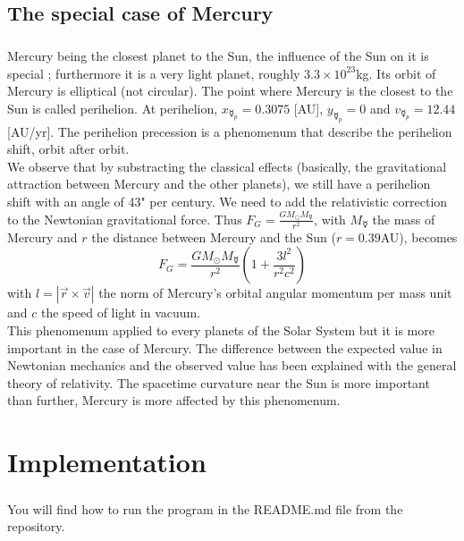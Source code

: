 \documentclass[a4paper, twoside, 11pt]{report}
\theoremstyle{theorem}
\theoremstyle{remark}
\theoremstyle{exemple}
\begin{document}
        \section{The special case of Mercury}
        
                \paragraph{}Mercury being the closest planet to the Sun, the influence of the Sun on it is special ; furthermore it is a very light planet, roughly $3.3\times{10}^{23}$kg. Its orbit of Mercury is elliptical (not circular). The point where Mercury is the closest to the Sun is called perihelion. At perihelion, $x_{\mercury_p} = 0.3075$ [AU], $y_{\mercury_p} = 0$ and $v_{\mercury_p}=12.44$ [AU/yr]. The perihelion precession is a phenomenum that describe the perihelion shift, orbit after orbit. \\
                We observe that by substracting the classical effects (basically, the gravitational attraction between Mercury and the other planets), we still have a perihelion shift with an angle of 43" per century. We need to add the relativistic correction to the Newtonian gravitational force. Thus $\displaystyle F_G = \frac{GM_{\odot}M_{\mercury}}{r^2}$, with $M_{\mercury}$ the mass of Mercury and $r$ the distance between Mercury and the Sun ($r=0.39$AU), becomes
                    \begin{equation*}
                        F_G = \frac{GM_{\odot}M_{\mercury}}{r^2}(1 + \frac{3l^2}{r^2c^2})
                        \tag{13}
                    \end{equation*}
                with $l=|\vec{r}\times\vec{v}|$ the norm of Mercury's orbital angular momentum per mass unit and $c$ the speed of light in vacuum.\\
                This phenomenum applied to every planets of the Solar System but it is more important in the case of Mercury. The difference between the expected value in Newtonian mechanics and the observed value has been explained with the general theory of relativity. The spacetime curvature near the Sun is more important than further, Mercury is more affected by this phenomenum. 


\chapter{Implementation}

	\paragraph{}You will find how to run the program in the README.md file from the repository.
\end{document}
